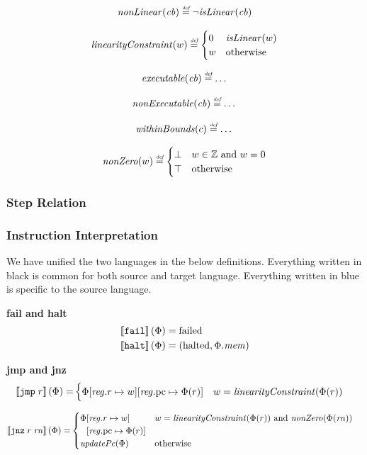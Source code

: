 \documentclass[a3paper]{article}
\newcommand{\defeq}{\stackrel{\textit{\tiny{def}}}{=}}
\newcommand{\sem}[1]{\left\llbracket #1 \right\rrbracket}
\newcommand{\tand}{\text{ and }}
\newcommand{\totherwise}{\text{otherwise }}
\newcommand{\sourcecolor}{\color{blue}}
\newcommand{\src}[1]{{\sourcecolor #1}}
\newcommand{\targetcolor}[1]{\color{black}}
\newcommand{\trg}[1]{{\targetcolor{} #1}}
\newcommand{\zinstr}[1]{\texttt{#1}}
\newcommand{\oneinstr}[2]{
  \ifthenelse{\equal{#2}{}}
  {\zinstr{#1}}
  {\zinstr{#1} \; #2}
}
\newcommand{\twoinstr}[3]{
  \ifthenelse{\equal{#2#3}{}}
  {\zinstr{#1}}
  {\zinstr{#1} \; #2 \; #3}
}
\newcommand{\tfail}{\zinstr{\trg{fail}}}
\newcommand{\thalt}{\zinstr{\trg{halt}}}
\newcommand{\tjmp}[1]{\oneinstr{\trg{jmp}}{#1}}
\newcommand{\tjnz}[2]{\twoinstr{\trg{jnz}}{#1}{#2}}
\newcommand{\ints}{\mathbb{Z}}
\newcommand{\update}[2]{[#1 \mapsto #2]}
\newcommand{\updReg}[2]{\update{\reg.#1}{#2}}
\newcommand{\failed}{\mathrm{failed}}
\newcommand{\halted}{\mathrm{halted}}
\newcommand{\var}[1]{\mathit{#1}}
\newcommand{\rn}{\var{rn}}
\newcommand{\reg}{\var{reg}}
\newcommand{\mem}{\var{mem}}
\newcommand{\cb}{\var{cb}}
\newcommand{\pcreg}{\mathrm{pc}}
\newcommand{\plainfun}[2]{
  \ifthenelse{\equal{#2}{}}
  {\mathit{#1}}
  {\mathit{#1}(#2)}
}
\newcommand{\exec}[1]{\plainfun{executable}{#1}}
\newcommand{\isLinear}[1]{\plainfun{isLinear}{#1}}
\newcommand{\linCons}[1]{\plainfun{linearityConstraint}{#1}}
\newcommand{\nonExec}[1]{\plainfun{nonExecutable}{#1}}
\newcommand{\nonLinear}[1]{\plainfun{nonLinear}{#1}}
\newcommand{\nonZero}[1]{\plainfun{nonZero}{#1}}
\newcommand{\updPcAddr}[1]{\plainfun{updatePc}{#1}}
\newcommand{\withinBounds}[1]{\plainfun{withinBounds}{#1}}
\begin{document}
\[
  \nonLinear{\cb} \defeq \neg \isLinear{\cb}
\]

\[
  \linCons{w} \defeq
  \begin{cases}
    0 & \isLinear{w} \\
    w & \totherwise
  \end{cases}
\]

\[
  \exec{\cb} \defeq \dots
\]

\[
  \nonExec{\cb} \defeq \dots
\]

\[
  \withinBounds{c} \defeq \dots
\]

\[
  \nonZero{w} \defeq
  \begin{cases}
    \bot & w \in \ints \tand w = 0 \\
    \top & \totherwise
  \end{cases}
\]

\subsubsection{Step Relation}

\subsubsection{Instruction Interpretation}
We have unified the two languages in the below definitions. Everything written in black is common for both source and target language. Everything written in \src{blue} is specific to the source language.

\noindent\textbf{fail and halt}\\
\begin{align*}
  \sem{\tfail}(\Phi) = & \; \failed \\
  \sem{\thalt}(\Phi) = & \; (\halted, \Phi.\mem)
\end{align*}

\noindent\textbf{jmp and jnz}\\
\begin{align*}
  \sem{\tjmp{r}}(\Phi) = &  
                     \begin{cases}
                       \Phi\updReg{r}{w}\updReg{\pcreg}{\Phi(r)} & w = \linCons{\Phi(r)}
                     \end{cases}
\end{align*}

\begin{align*}
  \sem{\tjnz{r}{\rn}}(\Phi) = &       
                             \begin{cases}
                               \arraycolsep=0pt
                               \begin{array}[t]{rl}
                                 \Phi&\updReg{r}{w}\\
                                     &\updReg{\pcreg}{\Phi(r)}
                               \end{array} 
                                              & w = \linCons{\Phi(r)} \tand \nonZero{\Phi(\rn)}\\
                               \updPcAddr{\Phi} & \totherwise
                             \end{cases}
\end{align*}
\end{document}

